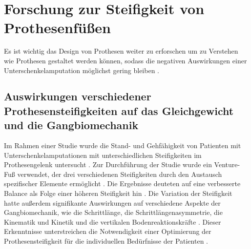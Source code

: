 \section{Forschung zur Steifigkeit von Prothesenfüßen} 
Es ist wichtig das Design von Prothesen weiter zu erforschen um zu Verstehen wie Prothesen gestaltet werden können, sodass die negativen Auswirkungen einer Unterschenkelamputation möglichst gering bleiben \cite{Major.2014}.

\subsection{Auswirkungen verschiedener Prothesensteifigkeiten auf das Gleichgewicht und die Gangbiomechanik}
Im Rahmen einer Studie wurde die Stand- und Gehfähigkeit von Patienten mit Unterschenkelamputationen mit unterschiedlichen Steifigkeiten im Prothesengelenk untersucht \cite{Vaca.2022}. Zur Durchführung der Studie wurde ein Venture-Fuß verwendet, der drei verschiedenen Steifigkeiten durch den Austausch spezifischer Elemente ermöglicht \cite{Vaca.2022}. Die Ergebnisse deuteten auf eine verbesserte Balance als Folge einer höheren Steifigkeit hin \cite{Vaca.2022}. Die Variation der Steifigkeit hatte außerdem signifikante Auswirkungen auf verschiedene Aspekte der Gangbiomechanik, wie die Schrittlänge, die Schrittlängenasymmetrie, die Kinematik und Kinetik und die vertikalen Bodenreaktionskräfte \cite{Vaca.2022}. Dieser Erkenntnisse unterstreichen die Notwendigkeit einer Optimierung der Prothesensteifigkeit für die individuellen Bedürfnisse der Patienten \cite{Vaca.2022}.


